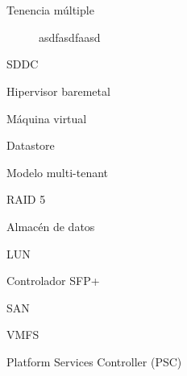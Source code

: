 \chapter*{\nomeglosariotermos}
\label{chap:glosario-termos}


\begin{description}
 \item [Tenencia múltiple] asdfasdfaasd
 \label{itm:tenenciamultiple}
 \item [SDDC]
 \label{itm:sddc}
 \item [Hipervisor baremetal]
  \label{itm:baremetal}
 \item [Máquina virtual]
  \label{itm:vm}
 \item [Datastore]
 \label{itm:datastore}
 \item [Modelo multi-tenant]
 \label{itm:multitenant}
 \item [RAID 5]
 \label{itm:raid5}
 \item [Almacén de datos]
 \label{itm:almacendatos}
 \item [LUN]
 \label{itm:lun}
 \item [Controlador SFP+]
 \label{itm:sfp}
 \item [SAN]
 \label{itm:san}
 \item [VMFS]
 \label{itm:vmfs}
 \item [Platform Services Controller (PSC)]
 \label{itm:psc}
 \item []
\end{description}
